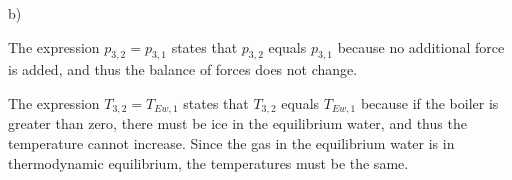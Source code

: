 b)

The expression \( p_{3,2} = p_{3,1} \) states that \( p_{3,2} \) equals \( p_{3,1} \) because no additional force is added, and thus the balance of forces does not change.

The expression \( T_{3,2} = T_{Ew,1} \) states that \( T_{3,2} \) equals \( T_{Ew,1} \) because if the boiler is greater than zero, there must be ice in the equilibrium water, and thus the temperature cannot increase. Since the gas in the equilibrium water is in thermodynamic equilibrium, the temperatures must be the same.
